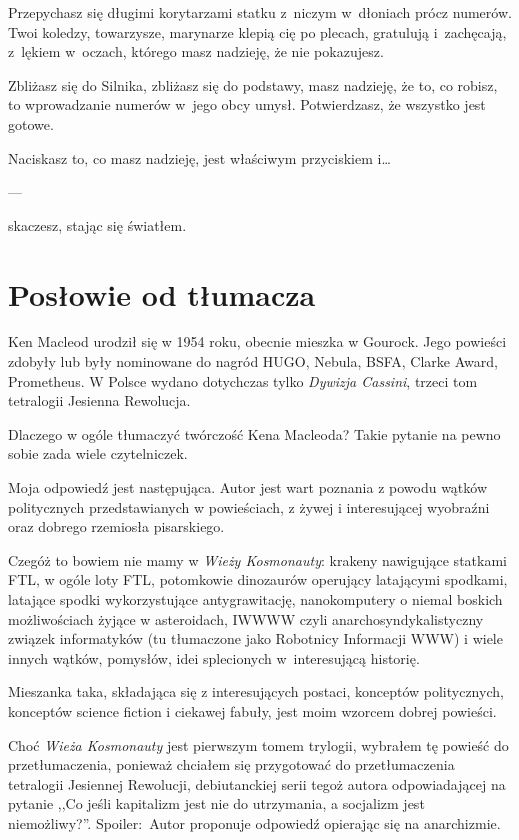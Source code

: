 \documentclass[oneside,polish,12pt,sfheadings]{mwbk}
\begin{document}
Przepychasz się długimi korytarzami
statku z~niczym w~dłoniach prócz numerów. Twoi koledzy, towarzysze,
marynarze klepią cię po plecach, gratulują i~zachęcają, z~lękiem w~oczach, którego masz nadzieję, że nie pokazujesz.

Zbliżasz się do Silnika, zbliżasz się do podstawy, masz nadzieję, że to,
co robisz, to wprowadzanie numerów w~jego obcy umysł. Potwierdzasz, że
wszystko jest gotowe.

Naciskasz to, co masz nadzieję, jest właściwym przyciskiem i\ldots

\begin{center}
---
\end{center}

skaczesz, stając się światłem.

\chapter{Posłowie od tłumacza}

Ken Macleod urodził się w 1954 roku, obecnie mieszka w Gourock. Jego powieści zdobyły lub były nominowane do nagród HUGO, Nebula, BSFA,  Clarke Award, Prometheus. W Polsce wydano dotychczas tylko \emph{Dywizja Cassini}, trzeci tom tetralogii Jesienna Rewolucja.

Dlaczego w ogóle tłumaczyć twórczość Kena Macleoda? Takie pytanie na pewno sobie zada wiele czytelniczek. 

Moja odpowiedź jest następująca. Autor jest wart poznania z powodu wątków politycznych przedstawianych w powieściach, z żywej i interesującej wyobraźni oraz dobrego rzemiosła pisarskiego. 

Czegóż to bowiem nie mamy w \emph{Wieży Kosmonauty}: krakeny nawigujące statkami FTL, w ogóle loty FTL, potomkowie dinozaurów operujący latającymi spodkami, latające spodki wykorzystujące antygrawitację, nanokomputery o niemal boskich możliwościach żyjące w asteroidach, IWWWW czyli anarchosyndykalistyczny związek informatyków (tu tłumaczone jako Robotnicy Informacji WWW) i wiele innych wątków, pomysłów, idei splecionych w~interesującą historię. 

Mieszanka taka, składająca się z interesujących postaci, konceptów politycznych, konceptów science fiction i ciekawej fabuły, jest moim wzorcem dobrej powieści.

Choć \emph{Wieża Kosmonauty} jest pierwszym tomem trylogii, wybrałem tę powieść do przetłumaczenia, ponieważ chciałem się przygotować do przetłumaczenia tetralogii Jesiennej Rewolucji, debiutanckiej serii tegoż autora odpowiadającej na pytanie ,,Co jeśli kapitalizm jest nie do utrzymania, a socjalizm jest niemożliwy?''. Spoiler:~Autor proponuje odpowiedź opierając się na anarchizmie.\\
\end{document}
